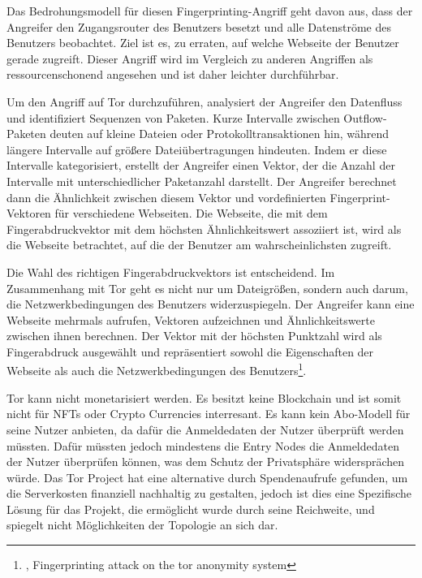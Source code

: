 Das Bedrohungsmodell für diesen Fingerprinting-Angriff geht davon aus, dass der Angreifer den Zugangsrouter des Benutzers besetzt und alle Datenströme des Benutzers beobachtet. Ziel ist es, zu erraten, auf welche Webseite der Benutzer gerade zugreift. Dieser Angriff wird im Vergleich zu anderen Angriffen als ressourcenschonend angesehen und ist daher leichter durchführbar.

Um den Angriff auf Tor durchzuführen, analysiert der Angreifer den Datenfluss und identifiziert Sequenzen von Paketen. Kurze Intervalle zwischen Outflow-Paketen deuten auf kleine Dateien oder Protokolltransaktionen hin, während längere Intervalle auf größere Dateiübertragungen hindeuten. Indem er diese Intervalle kategorisiert, erstellt der Angreifer einen Vektor, der die Anzahl der Intervalle mit unterschiedlicher Paketanzahl darstellt. Der Angreifer berechnet dann die Ähnlichkeit zwischen diesem Vektor und vordefinierten Fingerprint-Vektoren für verschiedene Webseiten. Die Webseite, die mit dem Fingerabdruckvektor mit dem höchsten Ähnlichkeitswert assoziiert ist, wird als die Webseite betrachtet, auf die der Benutzer am wahrscheinlichsten zugreift.

Die Wahl des richtigen Fingerabdruckvektors ist entscheidend. Im Zusammenhang mit Tor geht es nicht nur um Dateigrößen, sondern auch darum, die Netzwerkbedingungen des Benutzers widerzuspiegeln. Der Angreifer kann eine Webseite mehrmals aufrufen, Vektoren aufzeichnen und Ähnlichkeitswerte zwischen ihnen berechnen. Der Vektor mit der höchsten Punktzahl wird als Fingerabdruck ausgewählt und repräsentiert sowohl die Eigenschaften der Webseite als auch die Netzwerkbedingungen des Benutzers\footnote{\cite{FingerprintingOnTorAttack}, Fingerprinting attack on the tor anonymity system}.

Tor kann nicht monetarisiert werden. Es besitzt keine Blockchain und ist somit nicht für NFTs oder Crypto Currencies interresant. Es kann kein Abo-Modell für seine Nutzer anbieten, da dafür die Anmeldedaten der Nutzer überprüft werden müssten. Dafür müssten jedoch mindestens die Entry Nodes die Anmeldedaten der Nutzer überprüfen können, was dem Schutz der Privatsphäre widersprächen würde. Das Tor Project hat eine alternative durch Spendenaufrufe gefunden, um die Serverkosten finanziell nachhaltig zu gestalten, jedoch ist dies eine Spezifische Lösung für das Projekt, die ermöglicht wurde durch seine Reichweite, und spiegelt nicht Möglichkeiten der Topologie an sich dar.
